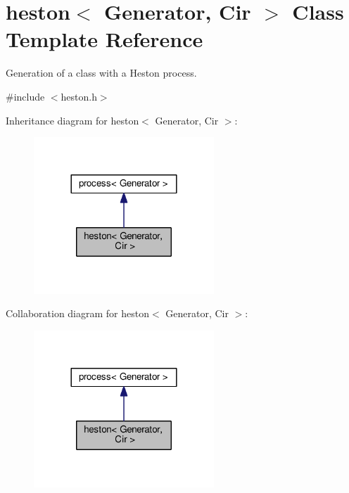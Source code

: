 \hypertarget{classheston}{}\section{heston$<$ Generator, Cir $>$ Class Template Reference}
\label{classheston}


Generation of a class with a Heston process.  




{\ttfamily \#include $<$heston.\+h$>$}



Inheritance diagram for heston$<$ Generator, Cir $>$\+:\nopagebreak
\begin{figure}[H]
\begin{center}
\leavevmode
\includegraphics[width=192pt]{classheston__inherit__graph}
\end{center}
\end{figure}


Collaboration diagram for heston$<$ Generator, Cir $>$\+:\nopagebreak
\begin{figure}[H]
\begin{center}
\leavevmode
\includegraphics[width=192pt]{classheston__coll__graph}
\end{center}
\end{figure}
